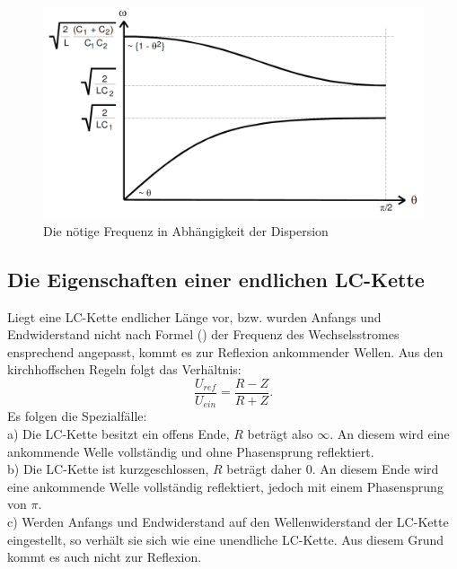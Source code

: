  \begin{figure}[H]
   \centering
   \includegraphics[width=\linewidth-200pt,height=\textheight-200pt,keepaspectratio]{content/Grafiken/Dispersionskurven.png}
   \caption{Die nötige Frequenz in Abhängigkeit der Dispersion}
   \label{fig:LC-Kette}
 \end{figure}


\subsection{Die Eigenschaften einer endlichen LC-Kette}
Liegt eine LC-Kette endlicher Länge vor, bzw. wurden Anfangs und Endwiderstand
 nicht nach Formel () der Frequenz des Wechselsstromes ensprechend angepasst,
  kommt es zur Reflexion ankommender Wellen. Aus den kirchhoffschen Regeln folgt das Verhältnis:
  \begin{equation}
    \frac{U_{ref}}{U_{ein}} = \frac{R-Z}{R+Z}\text{.}
  \end{equation}
  Es folgen die Spezialfälle:\\

  a) Die LC-Kette besitzt ein offens Ende, $R$ beträgt also $\infty$. An diesem
   wird eine ankommende Welle vollständig und ohne Phasensprung reflektiert.\\

  b) Die LC-Kette ist kurzgeschlossen, $R$ beträgt daher 0. An diesem Ende wird
   eine ankommende Welle vollständig reflektiert, jedoch mit einem Phasensprung von $\pi$.\\

 c) Werden Anfangs und Endwiderstand auf den Wellenwiderstand der LC-Kette eingestellt,
  so verhält sie sich wie eine unendliche LC-Kette. Aus diesem Grund kommt es auch nicht zur Reflexion.
